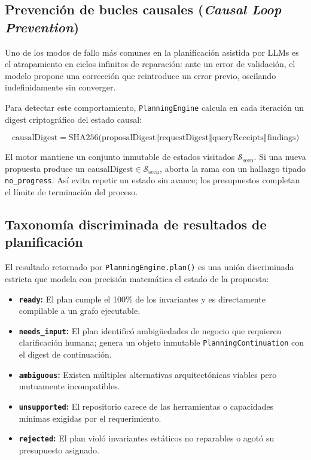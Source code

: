 \subsection{Prevención de bucles causales (\emph{Causal Loop Prevention})}

Uno de los modos de fallo más comunes en la planificación asistida por LLMs es el atrapamiento en ciclos infinitos de reparación: ante un error de validación, el modelo propone una corrección que reintroduce un error previo, oscilando indefinidamente sin converger.

Para detectar este comportamiento, \texttt{PlanningEngine} calcula en cada iteración un digest criptográfico del estado causal:

\begin{equation}
\text{causalDigest} = \text{SHA256}\Big(\text{proposalDigest} \mathbin{\Vert} \text{requestDigest} \mathbin{\Vert} \text{queryReceipts} \mathbin{\Vert} \text{findings}\Big)
\label{eq:causal-digest}
\end{equation}

El motor mantiene un conjunto inmutable de estados visitados $\mathcal{S}_{\text{seen}}$. Si una nueva propuesta produce un $\text{causalDigest} \in \mathcal{S}_{\text{seen}}$, aborta la rama con un hallazgo tipado \texttt{no\_progress}. Así evita repetir un estado sin avance; los presupuestos completan el límite de terminación del proceso.

\subsection{Taxonomía discriminada de resultados de planificación}

El resultado retornado por \texttt{PlanningEngine.plan()} es una unión discriminada estricta que modela con precisión matemática el estado de la propuesta:

\begin{itemize}
  \item \textbf{\texttt{ready}:} El plan cumple el 100\% de los invariantes y es directamente compilable a un grafo ejecutable.
  \item \textbf{\texttt{needs\_input}:} El plan identificó ambigüedades de negocio que requieren clarificación humana; genera un objeto inmutable \texttt{PlanningContinuation} con el digest de continuación.
  \item \textbf{\texttt{ambiguous}:} Existen múltiples alternativas arquitectónicas viables pero mutuamente incompatibles.
  \item \textbf{\texttt{unsupported}:} El repositorio carece de las herramientas o capacidades mínimas exigidas por el requerimiento.
  \item \textbf{\texttt{rejected}:} El plan violó invariantes estáticos no reparables o agotó su presupuesto asignado.
\end{itemize}

